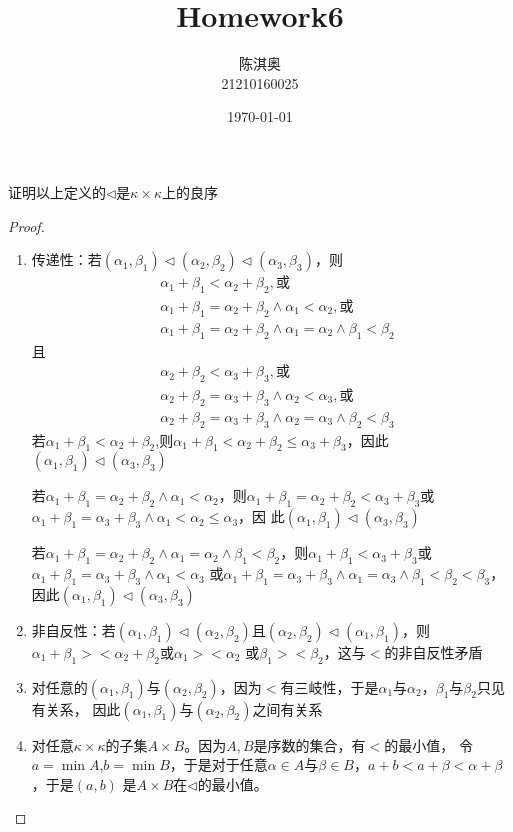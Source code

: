 \documentclass[11pt]{article}
\author{陈淇奥\\21210160025}
\date{\today}
\title{Homework6}
\begin{document}
\maketitle
\begin{exercise}[2.2.6]
证明以上定义的\(\lhd\)是\(\kappa\times\kappa\)上的良序
\end{exercise}

\begin{proof}
\begin{enumerate}
\item 传递性：若\((\alpha_1,\beta_1)\lhd(\alpha_2,\beta_2)\lhd(\alpha_3,\beta_3)\)，则
\begin{align*}
 &\alpha_1+\beta_1<\alpha_2+\beta_2,\text{或}\\
 &\alpha_1+\beta_1=\alpha_2+\beta_2\wedge\alpha_1<\alpha_2,\text{或}\\
 &\alpha_1+\beta_1=\alpha_2+\beta_2\wedge\alpha_1=\alpha_2\wedge\beta_1<\beta_2
\end{align*}
且
 \begin{align*}
 &\alpha_2+\beta_2<\alpha_3+\beta_3,\text{或}\\
 &\alpha_2+\beta_2=\alpha_3+\beta_3\wedge\alpha_2<\alpha_3,\text{或}\\
 &\alpha_2+\beta_2=\alpha_3+\beta_3\wedge\alpha_2=\alpha_3\wedge\beta_2<\beta_3
\end{align*}
若\(\alpha_1+\beta_1<\alpha_2+\beta_2\),则\(\alpha_1+\beta_1<\alpha_2+\beta_2\le\alpha_3+\beta_3\)，因此\((\alpha_1,\beta_1)\lhd(\alpha_3,\beta_3)\)

若\(\alpha_1+\beta_1=\alpha_2+\beta_2\wedge\alpha_1<\alpha_2\)，则\(\alpha_1+\beta_1=\alpha_2+\beta_2<\alpha_3+\beta_3\)或\(\alpha_1+\beta_1=\alpha_3+\beta_3\wedge\alpha_1<\alpha_2\le\alpha_3\)，因
此\((\alpha_1,\beta_1)\lhd(\alpha_3,\beta_3)\)

若\(\alpha_1+\beta_1=\alpha_2+\beta_2\wedge\alpha_1=\alpha_2\wedge\beta_1<\beta_2\)，则\(\alpha_1+\beta_1<\alpha_3+\beta_3\)或\(\alpha_1+\beta_1=\alpha_3+\beta_3\wedge\alpha_1<\alpha_3\)
或\(\alpha_1+\beta_1=\alpha_3+\beta_3\wedge\alpha_1=\alpha_3\wedge\beta_1<\beta_2<\beta_3\)，因此\((\alpha_1,\beta_1)\lhd(\alpha_3,\beta_3)\)

\item 非自反性：若\((\alpha_1,\beta_1)\lhd(\alpha_2,\beta_2)\)且\((\alpha_2,\beta_2)\lhd(\alpha_1,\beta_1)\)，则\(\alpha_1+\beta_1><\alpha_2+\beta_2\)或\(\alpha_1><\alpha_2\)
或\(\beta_1><\beta_2\)，这与\(<\)的非自反性矛盾

\item 对任意的\((\alpha_1,\beta_1)\)与\((\alpha_2,\beta_2)\)，因为\(<\)有三岐性，于是\(\alpha_1\)与\(\alpha_2\)，\(\beta_1\)与\(\beta_2\)只见有关系，
因此\((\alpha_1,\beta_1)\)与\((\alpha_2,\beta_2)\)之间有关系

\item 对任意\(\kappa\times\kappa\)的子集\(A\times B\)。因为\(A,B\)是序数的集合，有\(<\)的最小值，
令\(a=\min A\),\(b=\min B\)，于是对于任意\(\alpha\in A\)与\(\beta\in B\)，\(a+b<a+\beta<\alpha+\beta\)，于是\((a,b)\)
是\(A\times B\)在\(\lhd\)的最小值。
\end{enumerate}
\end{proof}
\end{document}
